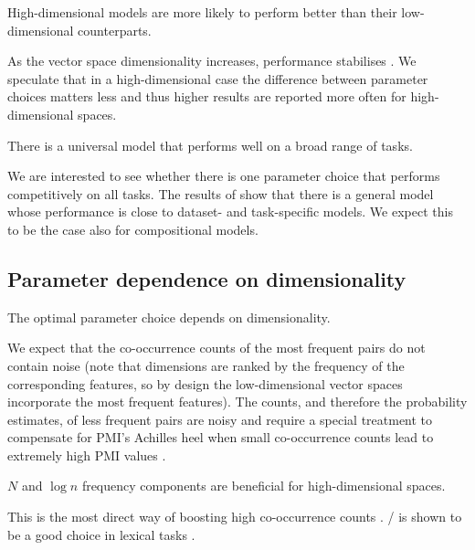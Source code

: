 \begin{hyp}
\label{hyp:var}
High-dimensional models are more likely to perform better than their low-dimensional counterparts.
\end{hyp}

As the vector space dimensionality increases, performance stabilises \cite{kiela-clark:2014:CVSC,BullinariaLevy2012,lapesa2014large}. We speculate that in a high-dimensional case the difference between parameter choices matters less and thus higher results are reported more often for high-dimensional spaces.

\begin{hyp}
\label{hyp:universal}
There is a universal model that performs well on a broad range of tasks.
\end{hyp}

We are interested to see whether there is one parameter choice that performs competitively on all tasks. The results of \citet{lapesa2014large} show that there is a general model whose performance is close to dataset- and task-specific models. We expect this to be the case also for compositional models.

\subsection{Parameter dependence on dimensionality}
\label{sec:hyp-dimen}

\begin{hyp}
\label{hyp:dimen}
The optimal parameter choice depends on dimensionality.
\end{hyp}

We expect that the co-occurrence counts of the most frequent pairs do not contain noise (note that dimensions are ranked by the frequency of the corresponding features, so by design the low-dimensional vector spaces incorporate the most frequent features). The counts, and therefore the probability estimates, of less frequent pairs are noisy and require a special treatment to compensate for PMI's Achilles heel when small co-occurrence counts lead to extremely high PMI values \cite{TACL570}.

\begin{hyp}
  \label{hyp:freq}
 $N$ and $\log n$ frequency components are beneficial for high-dimensional spaces.
\end{hyp}

This is the most direct way of boosting high co-occurrence counts \cite{Evert05}. \NPMI/ is shown to be a good choice in lexical tasks \cite{Bruni:2012:DST:2390524.2390544}.

